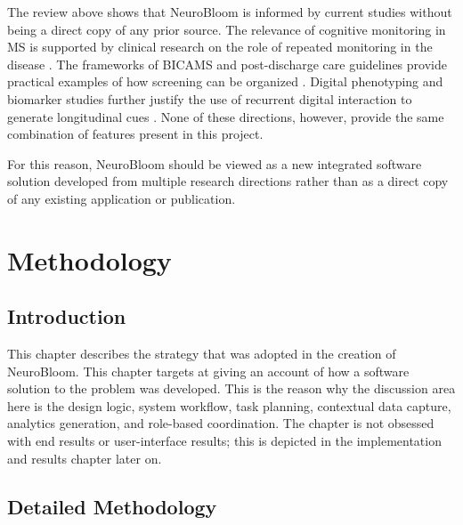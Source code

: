 \documentclass[12pt,a4paper]{report}
\begin{document}
\newpage
The review above shows that NeuroBloom is informed by current studies without being a direct copy of any prior source. The relevance of cognitive monitoring in MS is supported by clinical research on the role of repeated monitoring in the disease \cite{chiaravalloti2008,rocca2015}. The frameworks of BICAMS and post-discharge care guidelines provide practical examples of how screening can be organized \cite{benedict2012,kalb2018}. Digital phenotyping and biomarker studies further justify the use of recurrent digital interaction to generate longitudinal cues \cite{insel2017,dorsey2017,coravos2019}. None of these directions, however, provide the same combination of features present in this project.

For this reason, NeuroBloom should be viewed as a new integrated software solution developed from multiple research directions rather than as a direct copy of any existing application or publication.

\chapter{Methodology}

\section{Introduction}
This chapter describes the strategy that was adopted in the creation of NeuroBloom. This chapter targets at giving an account of how a software solution to the problem was developed. This is the reason why the discussion area here is the design logic, system workflow, task planning, contextual data capture, analytics generation, and role-based coordination. The chapter is not obsessed with end results or user-interface results; this is depicted in the implementation and results chapter later on.

\section{Detailed Methodology}
\end{document}
